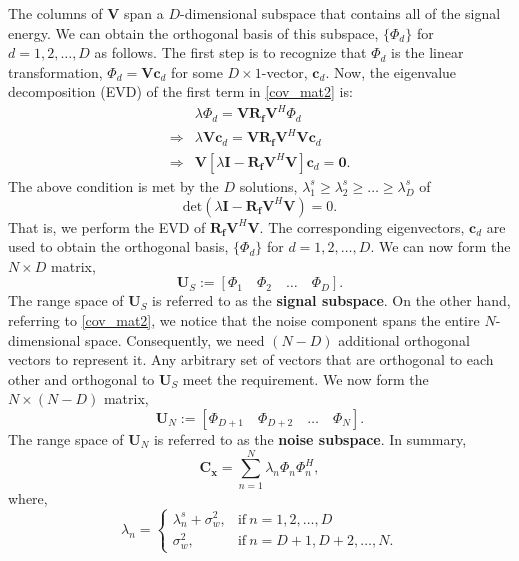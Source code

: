 \documentclass[a4paper, 11pt]{article}
\begin{document}
The columns of $\mathbf{V}$ span a $D$-dimensional subspace that contains all of the signal energy. We can obtain the orthogonal basis of this subspace, $\{\Phi_d\}$ for $d=1,2,\hdots,D$ as follows. The first step is to recognize that $\Phi_d$ is the linear transformation, $\Phi_d = \mathbf{V c}_d$ for some $D\times 1$-vector, $\mathbf{c}_d$. Now, the eigenvalue decomposition (EVD) of the first term in \eqref{cov_mat2} is:
\begin{align}
& \lambda\Phi_d = \mathbf{V}\mathbf{R_f}\mathbf{V}^H\Phi_d \nonumber \\
\Rightarrow& \lambda\mathbf{V c}_d = \mathbf{V}\mathbf{R_f}\mathbf{V}^H\mathbf{V c}_d \nonumber \\
\Rightarrow& \mathbf{V}\left[\lambda\mathbf{I}-\mathbf{R_f}\mathbf{V}^H\mathbf{V}\right]\mathbf{c}_d = \mathbf{0}. \nonumber
\end{align}
The above condition is met by the $D$ solutions, $\lambda_1^s\geq \lambda_2^s\geq \hdots \geq \lambda_D^s$ of 
\begin{equation*}
\mathrm{det}\left(\lambda\mathbf{I}-\mathbf{R_f}\mathbf{V}^H\mathbf{V}\right) = 0.
\end{equation*}
That is, we perform the EVD of $\mathbf{R_f}\mathbf{V}^H\mathbf{V}$. The corresponding eigenvectors, $\mathbf{c}_d$ are used to obtain the orthogonal basis, $\{\Phi_d\}$ for $d=1,2,\hdots,D$. We can now form the $N\times D$ matrix, 
\begin{equation}
\mathbf{U}_S := \left[\Phi_1\quad\Phi_2\quad\hdots\quad\Phi_D\right].
\end{equation}
The range space of $\mathbf{U}_S$ is referred to as the \textbf{signal subspace}. On the other hand, referring to \eqref{cov_mat2}, we notice that the noise component spans the entire $N$-dimensional space. Consequently, we need $(N-D)$ additional orthogonal vectors to represent it. Any arbitrary set of vectors that are orthogonal to each other and orthogonal to $\mathbf{U}_S$ meet the requirement. We now form the $N\times (N-D)$ matrix, 
\begin{equation}
\mathbf{U}_N := \left[\Phi_{D+1}\quad\Phi_{D+2}\quad\hdots\quad\Phi_N\right].
\end{equation}
The range space of $\mathbf{U}_N$ is referred to as the \textbf{noise subspace}. In summary,
\begin{equation}
\mathbf{C_x} = \sum_{n=1}^{N}\lambda_n\Phi_n\Phi_n^H,
\end{equation}
where,
\begin{equation}
\lambda_n=
\begin{cases}
\lambda_n^s+\sigma_w^2, & \text{if}\ n=1,2,\hdots,D \\
\sigma_w^2, & \text{if}\ n=D+1,D+2,\hdots,N. 
\end{cases}
\end{equation}
\end{document}
